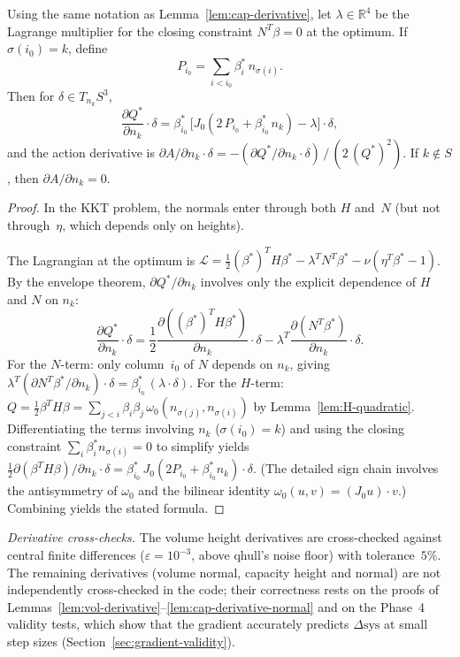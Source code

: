 \begin{lemma}
\label{lem:cap-derivative-normal}
Using the same notation as Lemma~\ref{lem:cap-derivative}, let
$\lambda \in \mathbb{R}^4$ be the Lagrange multiplier for the closing
constraint $N^T\beta = 0$ at the optimum. If $\sigma(i_0) = k$, define
\[
  P_{i_0} = \sum_{i < i_0} \beta_i^*\,n_{\sigma(i)}.
\]
Then for $\delta \in T_{n_k}S^3$,
\[
  \frac{\partial Q^*}{\partial n_k} \cdot \delta
  = \beta_{i_0}^*\,\bigl[J_0(2\,P_{i_0} + \beta_{i_0}^*\,n_k) - \lambda\bigr]
    \cdot \delta,
\]
and the action derivative is
$\partial A / \partial n_k \cdot \delta
= -(\partial Q^*/\partial n_k \cdot \delta)\,/\,(2\,(Q^*)^2)$.
If $k \notin S$, then $\partial A / \partial n_k = 0$.
\end{lemma}

\begin{proof}
In the KKT problem, the normals enter through both $H$ and~$N$
(but not through~$\eta$, which depends only on heights).

The Lagrangian at the optimum is
$\mathcal{L} = \tfrac{1}{2}(\beta^*)^T H\beta^* - \lambda^T N^T\beta^* - \nu(\eta^T\beta^* - 1)$.
By the envelope theorem, $\partial Q^*/\partial n_k$ involves only the
explicit dependence of $H$ and $N$ on $n_k$:
\[
  \frac{\partial Q^*}{\partial n_k} \cdot \delta
  = \frac{1}{2}\frac{\partial((\beta^*)^T H\beta^*)}{\partial n_k}\cdot\delta
    - \lambda^T\frac{\partial(N^T\beta^*)}{\partial n_k}\cdot\delta.
\]
For the $N$-term: only column~$i_0$ of $N$ depends on $n_k$, giving
$\lambda^T(\partial N^T\beta^*/\partial n_k)\cdot\delta = \beta_{i_0}^*\,(\lambda \cdot \delta)$.
For the $H$-term: $Q = \frac{1}{2}\beta^T H\beta
= \sum_{j < i} \beta_i \beta_j\,\omega_0(n_{\sigma(j)}, n_{\sigma(i)})$
by Lemma~\ref{lem:H-quadratic}. Differentiating the terms involving $n_k$
($\sigma(i_0) = k$) and using the closing constraint
$\sum_i \beta_i^* n_{\sigma(i)} = 0$ to simplify yields
$\frac{1}{2}\partial(\beta^T H\beta)/\partial n_k \cdot \delta
= \beta_{i_0}^*\,J_0(2P_{i_0} + \beta_{i_0}^* n_k) \cdot \delta$.
(The detailed sign chain involves the antisymmetry of $\omega_0$ and the
bilinear identity $\omega_0(u,v) = (J_0 u) \cdot v$.)
Combining yields the stated formula.
\end{proof}

\emph{Derivative cross-checks.}
The volume height derivatives are cross-checked against
central finite differences ($\varepsilon = 10^{-3}$,
above qhull's noise floor) with tolerance~$5\%$.
The remaining derivatives (volume normal, capacity height and normal) are
not independently cross-checked in the code; their correctness rests on
the proofs of Lemmas~\ref{lem:vol-derivative}--\ref{lem:cap-derivative-normal}
and on the Phase~4 validity tests, which show that the gradient accurately
predicts $\Delta\mathrm{sys}$ at small step sizes
(Section~\ref{sec:gradient-validity}).


